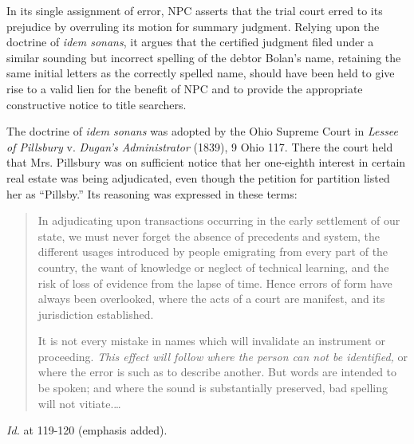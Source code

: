 In its single assignment of error, NPC asserts that the trial court erred to its
prejudice by overruling its motion for summary judgment. Relying upon the
doctrine of \textit{idem sonans}, it argues that the certified judgment filed
under a similar sounding but incorrect spelling of the debtor Bolan's name,
retaining the same initial letters as the correctly spelled name, should have
been held to give rise to a valid lien for the benefit of NPC and to provide
the appropriate constructive notice to title searchers.

The doctrine of \textit{idem sonans} was adopted by the Ohio Supreme Court in
\textit{Lessee of Pillsbury} v. \textit{Dugan's Administrator} (1839), 9 Ohio
117. There the court held that Mrs. Pillsbury was on sufficient notice that her
one-eighth interest in certain real estate was being adjudicated, even though
the petition for partition listed her as ``Pillsby.'' Its reasoning was
expressed in these terms:
\begin{quotation}
In adjudicating upon transactions occurring in the early settlement of our
state, we must never forget the absence of precedents and system, the different
usages introduced by people emigrating from every part of the country, the want
of knowledge or neglect of technical learning, and the risk of loss of evidence
from the lapse of time. Hence errors of form have always been overlooked, where
the acts of a court are manifest, and its jurisdiction established.

It is not every mistake in names which will invalidate an instrument or
proceeding. \textit{This effect will follow where the person can not be
identified,} or where the error is such as to describe another. But words are
intended to be spoken; and where the sound is substantially preserved, bad
spelling will not vitiate.\ldots
\end{quotation}
\textit{Id.} at 119-120 (emphasis added).

